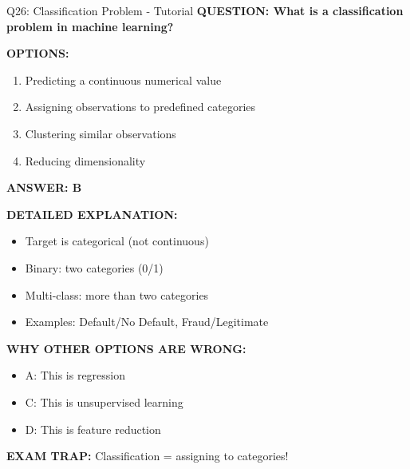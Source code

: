 \documentclass[8pt]{beamer}
\begin{document}
	\begin{frame}{Q26: Classification Problem - Tutorial}
		\fontsize{6.5}{7.5}\selectfont
		\textbf{QUESTION: What is a classification problem in machine learning?}
		
		\vspace{0.1cm}
		\textbf{OPTIONS:}
		\begin{enumerate}
			\item Predicting a continuous numerical value
			\item Assigning observations to predefined categories
			\item Clustering similar observations
			\item Reducing dimensionality
		\end{enumerate}
		
		\vspace{0.1cm}
		\textcolor{myblue}{\textbf{ANSWER: B}}
		
		\vspace{0.1cm}
		\textbf{DETAILED EXPLANATION:}
		\begin{itemize}
			\item Target is categorical (not continuous)
			\item Binary: two categories (0/1)
			\item Multi-class: more than two categories
			\item Examples: Default/No Default, Fraud/Legitimate
		\end{itemize}
		
		\vspace{0.1cm}
		\textcolor{myred}{\textbf{WHY OTHER OPTIONS ARE WRONG:}}
		\begin{itemize}
			\item \textcolor{myred}{A:} This is regression
			\item \textcolor{myred}{C:} This is unsupervised learning
			\item \textcolor{myred}{D:} This is feature reduction
		\end{itemize}
		
		\textcolor{myred}{\textbf{EXAM TRAP:}} Classification = \textcolor{myblue}{assigning to categories}!
	\end{frame}
	
\end{document}
